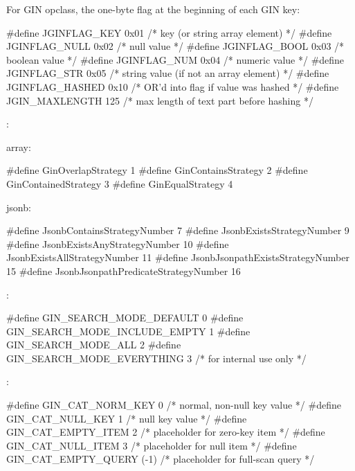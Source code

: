 For  GIN opclass, the one-byte flag at the beginning of
each GIN key:

\begin{ccode}
#define JGINFLAG_KEY    0x01    /* key (or string array element) */
#define JGINFLAG_NULL   0x02    /* null value */
#define JGINFLAG_BOOL   0x03    /* boolean value */
#define JGINFLAG_NUM    0x04    /* numeric value */
#define JGINFLAG_STR    0x05    /* string value (if not an array element) */
#define JGINFLAG_HASHED 0x10    /* OR'd into flag if value was hashed */
#define JGIN_MAXLENGTH  125     /* max length of text part before hashing */
\end{ccode}

:

\begin{oparts}
\item array:
  \begin{ccode}
  #define GinOverlapStrategy      1
  #define GinContainsStrategy     2
  #define GinContainedStrategy    3
  #define GinEqualStrategy        4
  \end{ccode}
\item jsonb:
  \begin{ccode}
  #define JsonbContainsStrategyNumber   7
  #define JsonbExistsStrategyNumber   9
  #define JsonbExistsAnyStrategyNumber  10
  #define JsonbExistsAllStrategyNumber  11
  #define JsonbJsonpathExistsStrategyNumber   15
  #define JsonbJsonpathPredicateStrategyNumber  16
  \end{ccode}
\end{oparts}

:

\begin{ccode}
#define GIN_SEARCH_MODE_DEFAULT         0
#define GIN_SEARCH_MODE_INCLUDE_EMPTY   1
#define GIN_SEARCH_MODE_ALL             2
#define GIN_SEARCH_MODE_EVERYTHING      3   /* for internal use only */
\end{ccode}

:

\begin{ccode}
#define GIN_CAT_NORM_KEY        0   /* normal, non-null key value */
#define GIN_CAT_NULL_KEY        1   /* null key value */
#define GIN_CAT_EMPTY_ITEM      2   /* placeholder for zero-key item */
#define GIN_CAT_NULL_ITEM       3   /* placeholder for null item */
#define GIN_CAT_EMPTY_QUERY     (-1)    /* placeholder for full-scan query */
\end{ccode}

